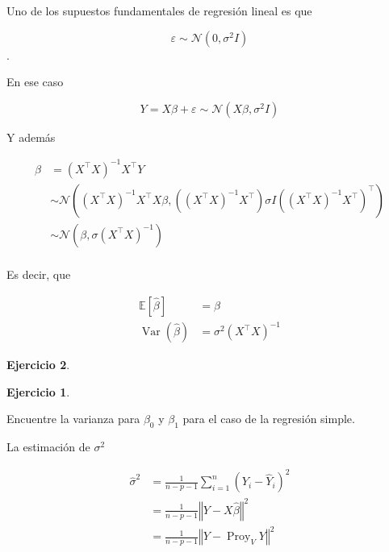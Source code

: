 \documentclass[
  12pt,
]{book}
\theoremstyle{definition}
\theoremstyle{definition}
\theoremstyle{definition}
\newtheorem{exercise}{Ejercicio}[chapter]
\theoremstyle{remark}
\begin{document}
Uno de los supuestos fundamentales de regresión lineal es que

\begin{equation*}
\varepsilon\sim \mathcal{N}\left(0,\sigma^{2}I\right)
\end{equation*} .

En ese caso

\begin{equation*}
Y = X\beta + \varepsilon \sim \mathcal{N}\left(X\beta,\sigma^{2}I\right)
\end{equation*}

Y además

\begin{align*}
\hat{\beta} &=  (X^{\top}X)^{-1}X^{\top}Y \\
&\sim  \mathcal{N}\left((X^{\top}X)^{-1}X^{\top}X\beta,((X^{\top}X)^{-1}X^{\top})\sigma I ((X^{\top}X)^{-1}X^{\top})^{\top}\right) \\
&\sim  \mathcal{N}\left(\beta,\sigma (X^{\top}X)^{-1}\right) \\
\end{align*}

Es decir, que

\begin{align*}
\mathbb{E}\left[\hat{\beta}\right] &= \beta \\
\operatorname{Var}(\hat{\beta}) &=  \sigma^{2}\left(X^{\top} X\right)^{-1}
\end{align*}

\begin{exercise}
\begin{exercise}
\protect\hypertarget{exr:unlabeled-div-46}{}\label{exr:unlabeled-div-46}

\protect\hypertarget{exr:unnamed-chunk-180}{}{\label{exr:unnamed-chunk-180} }Encuentre la varianza para \(\beta_{0}\) y \(\beta_{1}\) para el caso de la regresión simple.

\end{exercise}
\end{exercise}

La estimación de \(\sigma^{2}\)

\begin{align*}
 \hat{\sigma}^{2} 
 &=  \frac{1}{n-p-1} \sum_{i=1}^{n} \left( Y_{i} - \hat{Y}_{i}\right)^{2} \\
 &= \frac{1}{n-p-1}\left\Vert Y - X\hat{\beta} \right\Vert^{2} \\
 &=   \frac{1}{n-p-1} \left\Vert Y-\operatorname{Proy}_{V}Y \right\Vert^{2} 
 \end{align*}
\end{document}
